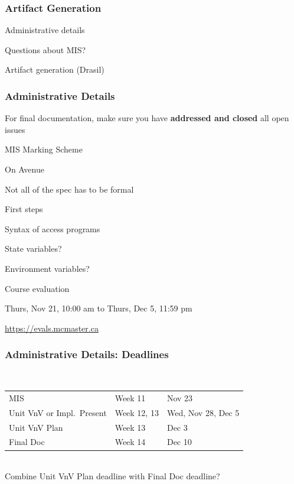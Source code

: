 \documentclass[t,12pt,numbers,fleqn]{beamer}
\begin{document}



\begin{frame}
\frametitle{Artifact Generation}

\bi
\item Administrative details
\item Questions about MIS?
\item Artifact generation (Drasil)
\ei
\end{frame}


\begin{frame}
\frametitle{Administrative Details}

\bi
\item For final documentation, make sure you have \textbf{addressed and closed}
  all open issues
\item MIS Marking Scheme
\bi
\item On Avenue
\item Not all of the spec has to be formal
\item First steps
\bi
\item Syntax of access programs
\item State variables?
\item Environment variables?
\ei
\ei
\item Course evaluation
\bi
\item Thurs, Nov 21, 10:00 am to Thurs, Dec 5, 11:59 pm
\item \url{https://evals.mcmaster.ca}
\ei
\ei

\end{frame}


\begin{frame}
\frametitle{Administrative Details: Deadlines}
~\newline
\begin{tabular}{l l l}
MIS & Week 11 & Nov 23\\
Unit VnV or Impl.\ Present & Week 12, 13 & Wed, Nov 28, Dec 5\\
Unit VnV Plan & Week 13 & Dec 3\\
Final Doc & Week 14 & Dec 10\\
\end {tabular}
~\\

Combine Unit VnV Plan deadline with Final Doc deadline?

\end{frame}
\end{document}
